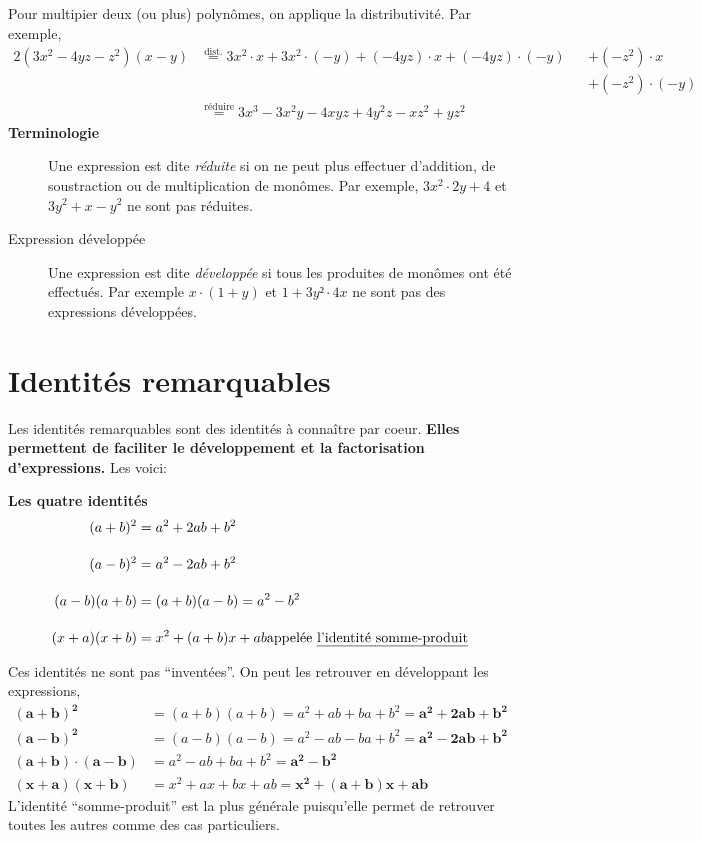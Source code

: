 \documentclass[a4paper,12pt]{report}
\begin{document}
Pour multipier deux (ou plus) polynômes, on applique la distributivité. Par exemple, 
\begin{alignat*}{2}
	(3x^2-4yz-z^2)(x-y)&\stackrel{\text{dist.}}{=}3x^2\cdot x+3x^2\cdot (-y)+(-4yz)\cdot x+(-4yz)\cdot (-y)&&+(-z^2)\cdot x\\&&&+(-z^2)\cdot (-y)\\
			   &\stackrel{\text{réduire}}{=}3x^3-3x^2y-4xyz+4y^2z-xz^2+yz^2&&
\end{alignat*}
{\bfseries Terminologie} 
\begin{description}
	\item[] Une expression est dite \emph{réduite} si on ne peut plus effectuer d'addition, de soustraction ou de multiplication de monômes. Par exemple, $3x^2\cdot 2y+4$ et $3y^2+x-y^2$ ne sont pas réduites.
	
	\item[Expression développée] Une expression est dite \emph{développée} si tous les produites de monômes ont été effectués. Par exemple $x\cdot (1+y)$ et $1+3y²\cdot 4x$ ne sont pas des expressions développées.
\end{description}

\section{Identités remarquables}
Les identités remarquables sont des identités à connaître par coeur. {\bfseries Elles permettent de faciliter le développement et la factorisation d'expressions.}
Les voici:

\begin{center}
{\bfseries Les quatre identités}
\begin{align}
	(a+b)^2&=a^2+2ab+b^2\\[1em]
	(a-b)^2&=a^2-2ab+b^2\\[1em]
	(a-b)(a+b)&=(a+b)(a-b)=a^2-b^2\\[1em]
	(x+a)(x+b)&=x^2+(a+b)x+ab \text{appelée \emph{l'identité somme-produit}}
\end{align}
\end{center}
Ces identités ne sont pas \enquote{inventées}.
On peut les retrouver en développant les expressions,
\begin{align*}
	\bm{(a+b)^2}&=(a+b)(a+b)=a^2+ab+ba+b^2=\bm{a^2+2ab+b^2}\\[1em]
	\bm{(a-b)^2}&=(a-b)(a-b)=a^2-ab-ba+b^2=\bm{a^2-2ab+b^2}\\[1em]
	\bm{(a+b)\cdot (a-b)}&=a^2-ab+ba+b^2=\bm{a^2-b^2}\\[1em]
	\bm{(x+a)(x+b)}&=x^2+ax+bx+ab=\bm{x^2+(a+b)x+ab}
\end{align*}
L'identité \enquote{somme-produit} est la plus générale puisqu'elle permet de retrouver toutes les autres comme des cas particuliers. 
\end{document}
